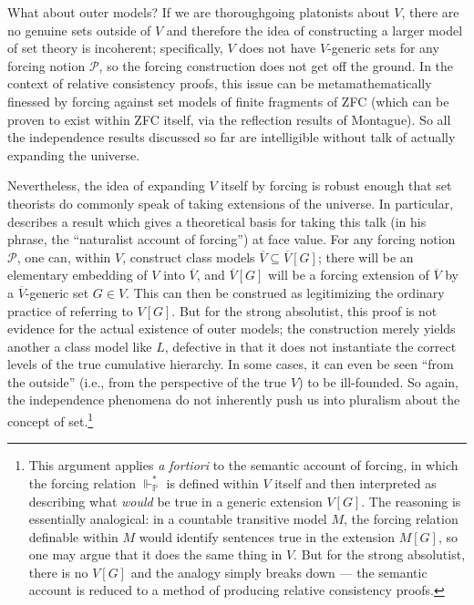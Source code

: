 \documentclass[letterpaper,12pt]{article}
\begin{document}
What about outer models? If we are thoroughgoing platonists about $V$, there are no genuine sets outside of $V$ and therefore the idea of constructing a larger model of set theory is incoherent; specifically, $V$ does not have $V$-generic sets for any forcing notion $\mathcal{P}$, so the forcing construction does not get off the ground. In the context of relative consistency proofs, this issue can be metamathematically finessed by forcing against set models of finite fragments of ZFC (which can be proven to exist within ZFC itself, via the reflection results of Montague). So all the independence results discussed so far are intelligible without talk of actually expanding the universe.

Nevertheless, the idea of expanding $V$ itself by forcing is robust enough that set theorists do commonly speak of taking extensions of the universe. In particular, \cite{hamkins2012set} describes a result which gives a theoretical basis for taking this talk (in his phrase, the ``naturalist account of forcing'') at face value. For any forcing notion $\mathcal{P}$, one can, within $V$, construct class models $\overline{V} \subseteq \overline{V}[G]$; there will be an elementary embedding of $V$ into $\overline{V}$, and $\overline{V}[G]$ will be a forcing extension of $\overline{V}$ by a $\overline{V}$-generic set $G \in V$. This can then be construed as legitimizing the ordinary practice of referring to $V[G]$. But for the strong absolutist, this proof is not evidence for the actual existence of outer models; the construction merely yields another a class model like $L$, defective in that it does not instantiate the correct levels of the true cumulative hierarchy. In some cases, it can even be seen ``from the outside'' (i.e., from the perspective of the true $V$) to be ill-founded. So again, the independence phenomena do not inherently push us into pluralism about the concept of set.\footnote{This argument applies \emph{a fortiori} to the semantic account of forcing, in which the forcing relation $\Vdash_{\mathbb{P}}^{*}$ is defined within $V$ itself and then interpreted as describing what \emph{would} be true in a generic extension $V[G]$. The reasoning is essentially analogical: in a countable transitive model $M$, the forcing relation definable within $M$ would identify sentences true in the extension $M[G]$, so one may argue that it does the same thing in $V$. But for the strong absolutist, there is no $V[G]$ and the analogy simply breaks down --- the semantic account is reduced to a method of producing relative consistency proofs.}
\end{document}
